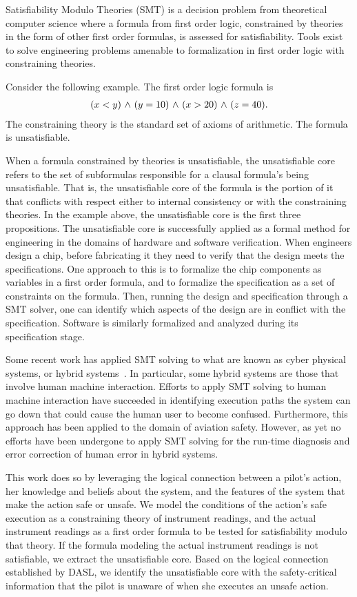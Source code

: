 Satisfiability Modulo Theories (SMT) is a decision problem from theoretical computer science where a formula from first order logic, constrained by theories in the form of other first order formulas, is assessed for satisfiability. Tools exist to solve engineering problems amenable to formalization in first order logic with constraining theories.

Consider the following example. The first order logic formula is
\begin{align*}
(x < y) {\ \wedge \ } 
(y = 10) {\ \wedge \ }
(x > 20) {\ \wedge \ } 
(z = 40).
\end{align*}
The constraining theory is the standard set of axioms of arithmetic. The formula is unsatisfiable.

When a formula constrained by theories is unsatisfiable, the unsatisfiable core refers to the set of subformulas responsible for a clausal formula's being unsatisfiable. That is, the unsatisfiable core of the formula is the portion of it that conflicts with respect either to internal consistency or with the constraining theories. In the example above, the unsatisfiable core is the first three propositions. The unsatisfiable core is successfully applied as a formal method for engineering in the domains of hardware and software verification. When engineers design a chip, before fabricating it they need to verify that the design meets the specifications. One approach to this is to formalize the chip components as variables in a first order formula, and to formalize the specification as a set of constraints on the formula. Then, running the design and specification through a SMT solver, one can identify which aspects of the design are in conflict with the specification. Software is similarly formalized and analyzed during its specification stage.

Some recent work has applied SMT solving to what are known as cyber physical systems, or hybrid systems~\cite{RushbyMC}. In particular, some hybrid systems are those that involve human machine interaction. Efforts to apply SMT solving to human machine interaction have succeeded in identifying execution paths the system can go down that could cause the human user to become confused. Furthermore, this approach has been applied to the domain of aviation safety. However, as yet no efforts have been undergone to apply SMT solving for the run-time diagnosis and error correction of human error in hybrid systems. 

This work does so by leveraging the logical connection between a pilot's action, her knowledge and beliefs about the system, and the features of the system that make the action safe or unsafe. We model the conditions of the action's safe execution as a constraining theory of instrument readings, and the actual instrument readings as a first order formula to be tested for satisfiability modulo that theory. If the formula modeling the actual instrument readings is not satisfiable, we extract the unsatisfiable core. Based on the logical connection established by DASL, we identify the unsatisfiable core with the safety-critical information that the pilot is unaware of when she executes an unsafe action.

